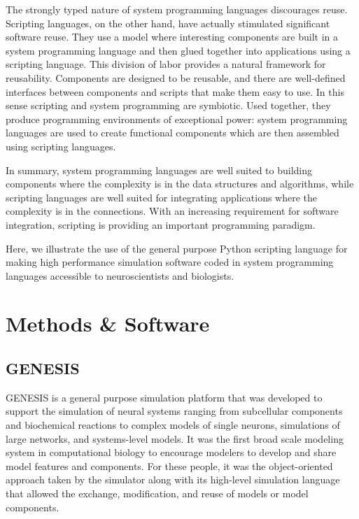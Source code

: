 \documentclass[12pt]{article}
\begin{document}
The strongly typed nature of system programming languages discourages
reuse. Scripting languages, on the other hand, have actually
stimulated significant software reuse. They use a model where
interesting components are built in a system programming language and
then glued together into applications using a scripting language.
This division of labor provides a natural framework for reusability.
Components are designed to be reusable, and there are well-defined
interfaces between components and scripts that make them easy to use.
In this sense scripting and system programming are symbiotic. Used
together, they produce programming environments of exceptional power:
system programming languages are used to create functional components
which are then assembled using scripting languages.

In summary, system programming languages are well suited to building
components where the complexity is in the data structures and
algorithms, while scripting languages are well suited for integrating
applications where the complexity is in the connections. With an
increasing requirement for software integration, scripting is
providing an important programming paradigm.

Here, we illustrate the use of the general purpose Python scripting language
for making high performance simulation software coded in system
programming languages accessible to neuroscientists and biologists.




\section{Methods \& Software}

\subsection{GENESIS}

GENESIS is a general purpose simulation
platform that was developed to support the simulation of neural
systems ranging from subcellular components and biochemical reactions
to complex models of single neurons, simulations of large networks,
and systems-level models. It was the first broad scale modeling system
in computational biology to encourage modelers to develop and share
model features and components. For these people, it was the
object-oriented approach taken by the simulator along with its
high-level simulation language that allowed the exchange,
modification, and reuse of models or model
components. 
\end{document}
